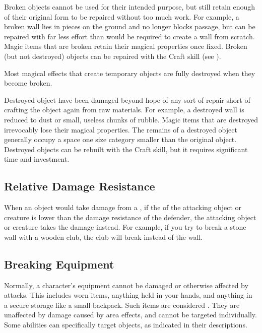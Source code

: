     Broken objects cannot be used for their intended purpose, but still retain enough of their original form to be repaired without too much work.
    For example, a broken wall lies in pieces on the ground and no longer blocks passage, but can be repaired with far less effort than would be required to create a wall from scratch.
    Magic items that are broken retain their magical properties once fixed.
    Broken (but not destroyed) objects can be repaired with the Craft skill (see ).

    Most magical effects that create temporary objects are fully destroyed when they become broken.

    Destroyed object have been damaged beyond hope of any sort of repair short of crafting the object again from raw materials.
    For example, a destroyed wall is reduced to dust or small, useless chunks of rubble.
    Magic items that are destroyed irrevocably lose their magical properties.
    The remains of a destroyed object generally occupy a space one size category smaller than the original object.
    Destroyed objects can be rebuilt with the Craft skill, but it requires significant time and investment.


  \subsection{Relative Damage Resistance}\label{Relative Damage Resistance}
    When an object would take damage from a , if the  of the attacking object or creature is lower than the damage resistance of the defender, the attacking object or creature takes the damage instead.
    For example, if you try to break a stone wall with a wooden club, the club will break instead of the wall.

  \subsection{Breaking Equipment}\label{Breaking Equipment}
    Normally, a character's equipment cannot be damaged or otherwise affected by attacks.
    This includes worn items, anything held in your hands, and anything in a secure storage like a small backpack.
    Such items are considered .
    They are unaffected by damage caused by area effects, and cannot be targeted individually.
    Some abilities can specifically target  objects, as indicated in their descriptions.

